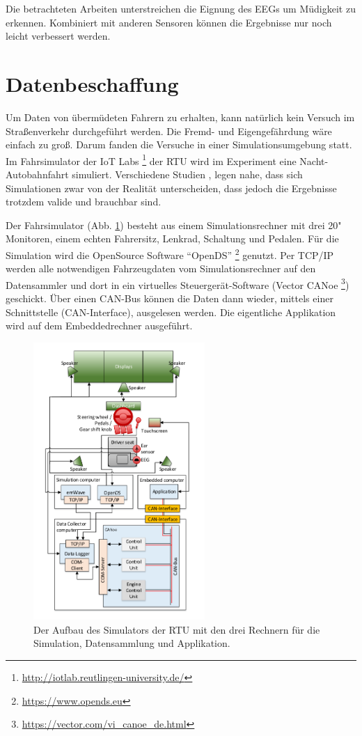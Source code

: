{Die betrachteten Arbeiten unterstreichen die Eignung des EEGs um Müdigkeit zu erkennen. Kombiniert mit anderen Sensoren können die Ergebnisse nur noch leicht verbessert werden.

\section{Datenbeschaffung}
\label{chap:data}
Um Daten von übermüdeten Fahrern zu erhalten, kann natürlich kein Versuch im Straßenverkehr durchgeführt werden. Die Fremd- und Eigengefährdung wäre einfach zu groß. Darum fanden die Versuche in einer Simulationsumgebung statt. Im Fahrsimulator der IoT Labs \footnote{\url{http://iotlab.reutlingen-university.de/}} der \acl{RTU} wird im Experiment eine Nacht-Autobahnfahrt simuliert. Verschiedene Studien \cite{Engstrom_2322937}, \cite{Horne_1757738} legen nahe, dass sich  Simulationen zwar von der Realität unterscheiden, dass jedoch die Ergebnisse trotzdem valide und brauchbar sind.

Der Fahrsimulator (Abb. \ref{fig:architecure}) besteht aus einem Simulationsrechner mit drei 20" Monitoren, einem echten Fahrersitz, Lenkrad, Schaltung und Pedalen. Für die Simulation wird die OpenSource Software "`OpenDS"' \footnote{\url{https://www.opends.eu}} genutzt. Per TCP/IP werden alle notwendigen Fahrzeugdaten vom Simulationsrechner auf den Datensammler und dort in ein virtuelles Steuergerät-Software (Vector CANoe \footnote{\url{https://vector.com/vi_canoe_de.html}}) geschickt. Über einen CAN-Bus können die Daten dann wieder, mittels einer Schnittstelle (CAN-Interface), ausgelesen werden. Die eigentliche Applikation wird auf dem Embeddedrechner ausgeführt.

\begin{figure}[h] 
  \begin{center}
    \includegraphics[width=6.5cm]{img/architecture}
    \caption[Aufbau des Simulators]{Der Aufbau des Simulators der \acl{RTU} mit den drei Rechnern für die Simulation, Datensammlung und Applikation. \label{fig:architecure}}
	

\end{center}
\end{figure}}
